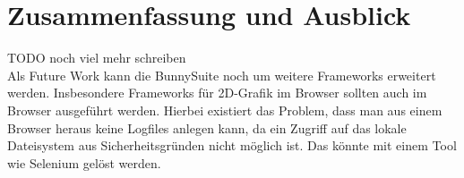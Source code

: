 \chapter{Zusammenfassung und Ausblick}
TODO noch viel mehr schreiben
\\
Als Future Work kann die BunnySuite noch um weitere Frameworks erweitert werden. Insbesondere Frameworks für 2D-Grafik im Browser sollten auch im Browser ausgeführt werden. Hierbei existiert das Problem, dass man aus einem Browser heraus keine Logfiles anlegen kann, da ein Zugriff auf das lokale Dateisystem aus Sicherheitsgründen nicht möglich ist. Das könnte mit einem Tool wie Selenium gelöst werden.
